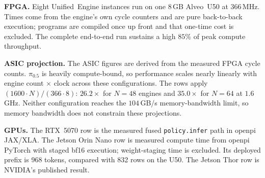 \documentclass[11pt]{article}
\newcommand{\pizero}{$\pi_{0.5}$}
\newcommand{\ue}{Unified~Engine}
\newcommand{\bfteen}{bf16}
\newcommand{\alveo}{Alveo~U50}
\begin{document}
\textbf{FPGA.} Eight \ue{} instances run on one $8$\,GB \alveo{} at
$366$\,MHz. Times come from the engine's own cycle counters and are pure
back-to-back execution; programs are compiled once up front and that one-time
cost is excluded. The complete end-to-end run sustains a high $85\%$ of peak
compute throughput.

\textbf{ASIC projection.} The ASIC figures are derived from the measured FPGA
cycle counts. \pizero{} is heavily compute-bound, so performance scales nearly
linearly with engine count $\times$ clock across these configurations. The rows
apply $(1600\cdot N)/(366\cdot 8)$: $26.2\times$ for $N{=}48$ engines and
$35.0\times$ for $N{=}64$ at $1.6$\,GHz. Neither configuration reaches the
$104$\,GB/s memory-bandwidth limit, so memory bandwidth does not constrain
these projections.

\textbf{GPUs.} The RTX~5070 row is the measured fused
\texttt{policy.infer} path in openpi JAX/XLA. The Jetson Orin Nano row is
measured compute time from openpi PyTorch with staged \bfteen{} execution;
weight-staging time is excluded. Its deployed prefix is 968 tokens, compared
with 832 rows on the U50. The Jetson Thor row is NVIDIA's published result.
\end{document}
